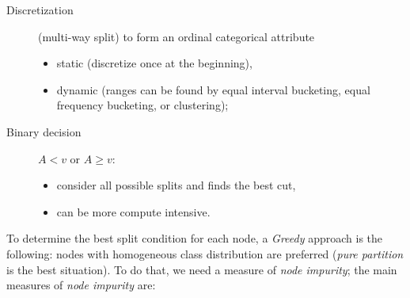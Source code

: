\begin{description}
	\item[Discretization] (multi-way split) to form an ordinal categorical attribute\mbox{}\\
	\begin{itemize}
		\item
		static (discretize once at the beginning),
		\item
		dynamic (ranges can be found by equal interval bucketing, equal frequency bucketing, or clustering);
	\end{itemize}
	\item[Binary decision] $A < v$ or $A \geq v$:\mbox{}\\
	\begin{itemize}
		\item
		consider all possible splits and finds the best cut,
		\item
		can be more compute intensive.
	\end{itemize}
\end{description}
To determine the best split condition for each node, a \emph{Greedy} approach is the following: nodes with homogeneous class distribution are preferred (\emph{pure partition} is the best situation).
To do that, we need a measure of \emph{node impurity}; the main measures of \emph{node impurity} are:
